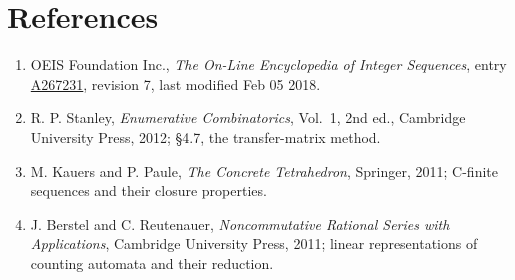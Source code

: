 \documentclass[11pt]{article}
\theoremstyle{definition}
\begin{document}
\section{References}

\begin{enumerate}

\item OEIS Foundation Inc., \emph{The On-Line Encyclopedia of Integer Sequences}, entry \href{https://oeis.org/A267231}{A267231}, revision 7, last modified Feb 05 2018.

\item R. P. Stanley, \emph{Enumerative Combinatorics}, Vol.~1, 2nd ed., Cambridge University Press, 2012; \S4.7, the transfer-matrix method.

\item M. Kauers and P. Paule, \emph{The Concrete Tetrahedron}, Springer, 2011; C-finite sequences and their closure properties.

\item J. Berstel and C. Reutenauer, \emph{Noncommutative Rational Series with Applications}, Cambridge University Press, 2011; linear representations of counting automata and their reduction.

\end{enumerate}
\end{document}
